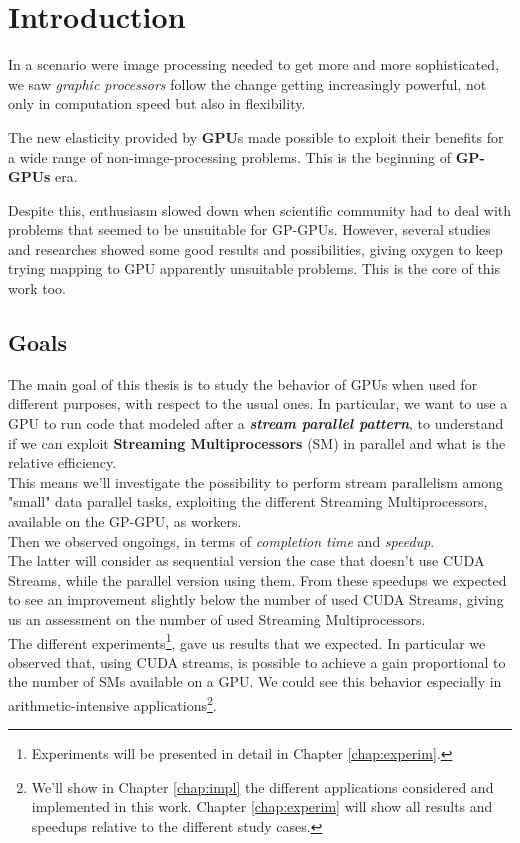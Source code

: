 
\chapter{Introduction}
\label{chap:intro}
In a scenario were image processing needed to get more and more sophisticated, we saw \textit{graphic processors} follow the change getting increasingly powerful, not only in computation speed but also in flexibility.

The new elasticity provided by \textbf{GPU}s made possible to exploit their benefits for a wide range of non-image-processing problems. This is the beginning of \textbf{GP-GPUs} era.

Despite this, enthusiasm slowed down when scientific community had to deal with problems that seemed to be unsuitable for GP-GPUs. However, several studies and researches showed some good results and possibilities, giving oxygen to keep trying mapping to GPU apparently unsuitable problems. This is the core of this work too.

\section{Goals}
	The main goal of this thesis is to study the behavior of GPUs when used for different purposes, with respect to the usual ones.
	In particular, we want to use a GPU to run code that modeled after a \textit{\textbf{stream parallel pattern}}, to understand if we can exploit \textbf{Streaming Multiprocessors} (SM) in parallel and what is the relative efficiency.\\
	This means we'll investigate the possibility to perform stream parallelism among "small" data parallel tasks, exploiting the different Streaming Multiprocessors, available on the GP-GPU, as workers. \\
	Then we observed ongoings, in terms of \textit{completion time} and \textit{speedup}.\\
	The latter will consider as sequential version the case that doesn't use CUDA Streams, while the parallel version using them.
	From these speedups we expected to see an improvement slightly below the number of used CUDA Streams, giving us an assessment on the number of used Streaming Multiprocessors.\\
	The different experiments\footnote{Experiments will be presented in detail in Chapter \ref{chap:experim}.}, gave us results that we expected. In particular we observed that, using CUDA streams, is possible to achieve a gain proportional to the number of SMs available on a GPU. We could see this behavior especially in arithmetic-intensive applications\footnote{We'll show in Chapter \ref{chap:impl} the different applications considered and implemented in this work. Chapter \ref{chap:experim} will show all results and speedups relative to the different study cases.}.
	
